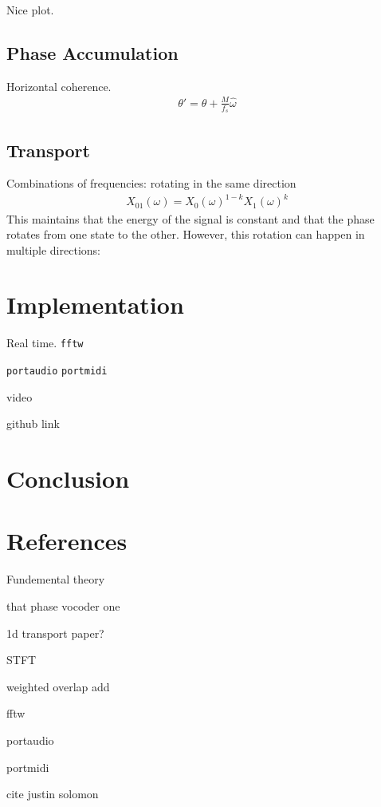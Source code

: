 \documentclass[12pt]{article}
\begin{document}
Nice plot.

\subsection{Phase Accumulation}
Horizontal coherence.
\begin{align*}
  \theta' = \theta + \frac{M}{f_s}\hat{\omega} 
\end{align*}

\subsection{Transport}

Combinations of frequencies:
rotating in the same direction
\begin{align}
  X_{01}(\omega) = 
  X_0(\omega)^{1-k}
  X_1(\omega)^k
\end{align}
This maintains that the energy of the signal is constant and that the phase rotates from one state to the other.
However, this rotation can happen in multiple directions:

\section{Implementation}
Real time.
\texttt{fftw}

\texttt{portaudio}
\texttt{portmidi}

video

github link

\section{Conclusion}

\section{References}

Fundemental theory

that phase vocoder one

1d transport paper?

STFT

weighted overlap add

fftw

portaudio

portmidi

cite justin solomon
\end{document}

